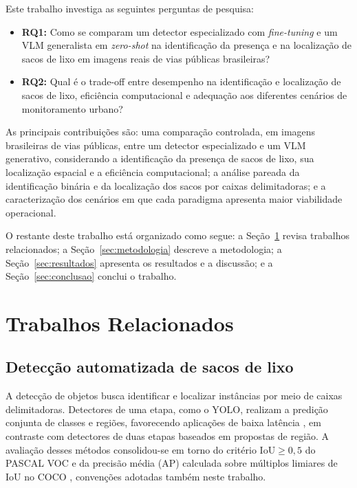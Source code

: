 \documentclass[kdmile,a4paper]{kdmile}
\begin{document}
Este trabalho investiga as seguintes perguntas de pesquisa:
\begin{itemize}
    \setlength{\itemsep}{0pt}
    \setlength{\parsep}{0pt}
    \setlength{\topsep}{2pt}
    \item \textbf{RQ1:} Como se comparam um detector especializado com \emph{fine-tuning} e um VLM generalista em \emph{zero-shot} na identificação da presença e na localização de sacos de lixo em imagens reais de vias públicas brasileiras?
    \item \textbf{RQ2:} Qual é o trade-off entre desempenho na identificação e localização de sacos de lixo, eficiência computacional e adequação aos diferentes cenários de monitoramento urbano?
\end{itemize}

As principais contribuições são: uma comparação controlada, em imagens brasileiras de vias públicas, entre um detector especializado e um VLM generativo, considerando a identificação da presença de sacos de lixo, sua localização espacial e a eficiência computacional; a análise pareada da identificação binária e da localização dos sacos por caixas delimitadoras; e a caracterização dos cenários em que cada paradigma apresenta maior viabilidade operacional.

O restante deste trabalho está organizado como segue: a Seção~\ref{sec:trabalhos-relacionados} revisa trabalhos relacionados; a Seção~\ref{sec:metodologia} descreve a metodologia; a Seção~\ref{sec:resultados} apresenta os resultados e a discussão; e a Seção~\ref{sec:conclusao} conclui o trabalho.

\section{Trabalhos Relacionados}
\label{sec:trabalhos-relacionados}

\subsection{Detecção automatizada de sacos de lixo}
\label{sec:deteccao-residuos}

A detecção de objetos busca identificar e localizar instâncias por meio de caixas delimitadoras. Detectores de uma etapa, como o YOLO, realizam a predição conjunta de classes e regiões, favorecendo aplicações de baixa latência \cite{Redmon2016YOLO,Ultralytics2024YOLO11}, em contraste com detectores de duas etapas baseados em propostas de região. A avaliação desses métodos consolidou-se em torno do critério $\mathrm{IoU} \ge 0{,}5$ do PASCAL VOC \cite{Everingham2010VOC} e da precisão média (AP) calculada sobre múltiplos limiares de IoU no COCO \cite{Lin2014COCO}, convenções adotadas também neste trabalho.
\end{document}
